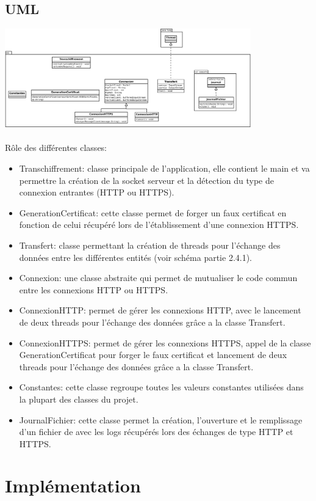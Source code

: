 \documentclass[a4paper,11pt,french]{report}
\begin{document}
\subsection{UML}
\includegraphics[width=0.8\textwidth]{images/uml.pdf}
~~\\
~~\\
Rôle des différentes classes:
\begin{itemize}
	\item Transchiffrement: classe principale de l'application, elle contient le main et va permettre la création de la socket serveur et la détection du type de connexion entrantes (HTTP ou HTTPS).
	\item GenerationCertificat: cette classe permet de forger un faux certificat en fonction de celui récupéré lors de l'établissement d'une connexion HTTPS.
	\item Transfert: classe permettant la création de threads pour l'échange des données entre les différentes entités (voir schéma partie 2.4.1).
	\item Connexion: une classe abstraite qui permet de mutualiser le code commun entre les connexions HTTP ou HTTPS.
	\item ConnexionHTTP: permet de gérer les connexions HTTP, avec le lancement de deux threads pour l'échange des données grâce a la classe Transfert.
	\item ConnexionHTTPS: permet de gérer les connexions HTTPS, appel de la classe GenerationCertificat pour forger le faux certificat et lancement de deux threads pour l'échange des données grâce a la classe Transfert.
	\item Constantes: cette classe regroupe toutes les valeurs constantes utilisées dans la plupart des classes du projet.
	\item JournalFichier: cette classe permet la création, l'ouverture et le remplissage d'un fichier de avec les logs récupérés lors des échanges de type HTTP et HTTPS.
\end{itemize}

\section{Implémentation}
\end{document}
